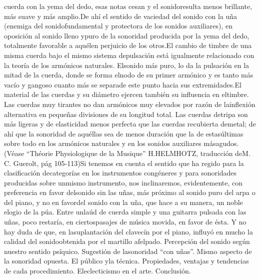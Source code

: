 \documentclass[
10pt, %
a4paper, %
oneside, %
headinclude,footinclude, %
BCOR5mm, %
]{scrartcl}
\begin{document}
{cuerda con la yema del dedo, esas notas cesan y el sonidoresulta menos brillante, más suave y más amplio.De ahí el sentido de vaciedad del sonido con la uña (enemiga del sonidofundamental y protectora de los sonidos auxiliares), en oposición al sonido lleno ypuro de la sonoridad producida por la yema del dedo, totalmente favorable a aquélen perjuicio de los otros.El cambio de timbre de una misma cuerda bajo el mismo sistema depulsación está igualmente relacionado con la teoría de los armónicos naturales. Elsonido más puro, lo da la pulsación en la mitad de la cuerda, donde se forma elnodo de su primer armónico y es tanto más vacío y gangoso cuanto más se separade este punto hacia sus extremidades.El material de las cuerdas y su diámetro ejercen también su influencia en eltimbre. Las cuerdas muy tirantes no dan armónicos muy elevados por razón de lainflexión alternativa en pequeñas divisiones de su longitud total. Las cuerdas detripa son más ligeras y de elasticidad menos perfecta que las cuerdas recubierta demetal; de ahí que la sonoridad de aquéllas sea de menos duración que la de estasúltimas sobre todo en los armónicos naturales y en los sonidos auxiliares másagudos. (Véase “Théorie Physiologique de la Musique” H.HELMHOTZ, traducción deM. C. Guerolt, pág 105-113)Si tenemos en cuenta el sentido que ha regido para la clasificación decategorías en los instrumentos congéneres y para sonoridades producidas sobre unmismo instrumento, nos inclinaremos, evidentemente, con preferencia en favor delsonido sin las uñas, más próximo al sonido puro del arpa o del piano, y no en favordel sonido con la uña, que hace a su manera, un noble elogio de la púa. Entre unlaúd de cuerda simple y una guitarra pulsada con las uñas, poco restaría, en ciertospasajes de música movida, en favor de ésta. Y no hay duda de que, en lasuplantación del clavecín por el piano, influyó en mucho la calidad del sonidoobtenida por el martillo afelpado. Percepción del sonido según nuestro sentido psíquico. Sugestión de lasonoridad “con uñas”. Mismo aspecto de la sonoridad opuesta. El público yla técnica. Propiedades, ventajas y tendencias de cada procedimiento. Eleclecticismo en el arte. Conclusión.
}
\end{document}
